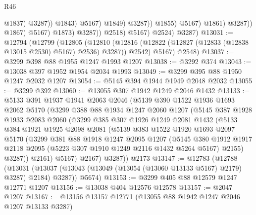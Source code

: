 \begin{lexlean}{R46}
\begin{coremodule}
                                                @1837)
                                              @3287))
                                          @1843)
                                        @5167)
                                      @1849)
                                    @3287))
                                @1855)
                              @5167)
                            @1861)
                          @3287))
                      @1867)
                    @5167)
                  @1873)
                @3287))
            @2518)
          @5167)
        @2524)
      @3287)
@13031 := @12794
    (@12799
      (@12805
        (@12810 (@12816 (@12822 (@12827 (@12833 (@12838 @13015 @2530) @5167) @2536) @3287)) @2542)
        @5167)
      @2548)
@13037 := @3299 @398 @88 @1955 @1247 @1993 @1207
@13038 := @3292 @374
@13043 := @13038 @397 @1952 @1954 @2034 @1993
@13049 := @3299 @395 @88 @1950 @1247 @2032 @1207
@13054 := @5145 @394 @1944 @1949 @2048 @2032
@13055 := @3299 @392
@13060 := @13055 @307 @1942 @1249 @2046 @1432
@13133 := @5133
    @391
    @1937
    @1941
    @2063
    @2046
    (@5139
      @390
      @1522
      @1936
      @1693
      @2062
      @5170
      (@3299
        @388
        @88
        @1934
        @1247
        @2060
        @1207
        (@5145
          @387
          @1928
          @1933
          @2083
          @2060
          (@3299
            @385
            @307
            @1926
            @1249
            @2081
            @1432
            (@5133
              @384
              @1921
              @1925
              @2098
              @2081
              (@5139
                @383
                @1522
                @1920
                @1693
                @2097
                @5170
                (@3299
                  @381
                  @88
                  @1918
                  @1247
                  @2095
                  @1207
                  (@5145
                    @380
                    @1912
                    @1917
                    @2118
                    @2095
                    (@5223 @307 @1910 @1249 @2116 @1432 @5264 @5167)
                    @2155)
                  @3287))
              @2161)
            @5167)
          @2167)
        @3287))
    @2173
@13147 := @12783
    (@12788
      (@13031 (@13037 (@13043 (@13049 (@13054 (@13060 @13133 @5167) @2179) @3287) @2184) @3287))
      @5674)
@13153 := @3299 @405 @88 @12579 @1247 @12771 @1207
@13156 := @13038 @404 @12576 @12578
@13157 := @2047 @1207
@13167 := @13156 @13157 @12771 (@13055 @88 @1942 @1247 @2046 @1207 @13133 @3287)

\end{coremodule}
\end{lexlean}
